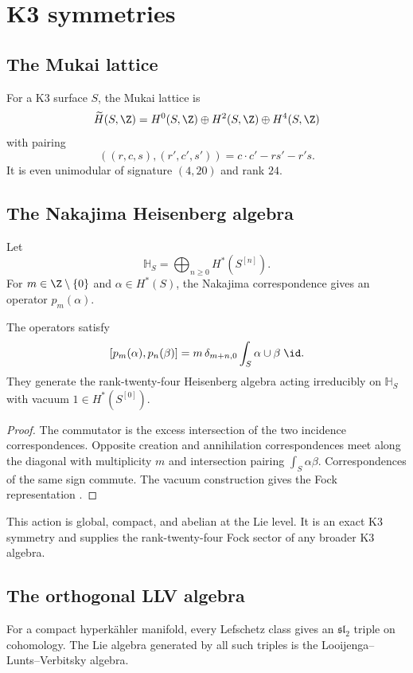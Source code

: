 \part{K3 symmetries}

\chapter{The Mukai lattice}
For a K3 surface $S$, the Mukai lattice is
\[
 \Mukai(S,\Z)=H^0(S,\Z)\oplus H^2(S,\Z)\oplus H^4(S,\Z)
\]
with pairing
\[
 ((r,c,s),(r',c',s'))=c\cdot c'-rs'-r's.
\]
It is even unimodular of signature $(4,20)$ and rank $24$.

\chapter{The Nakajima Heisenberg algebra}
Let
\[
 \mathbb H_S=\bigoplus_{n\ge0}H^*(S^{[n]}).
\]
For $m\in\Z\setminus\{0\}$ and $\alpha\in H^*(S)$, the Nakajima correspondence gives an operator $p_m(\alpha)$.

\begin{theorem}
The operators satisfy
\[
 [p_m(\alpha),p_n(\beta)]
 =m\,\delta_{m+n,0}\int_S\alpha\cup\beta\;\id.
\]
They generate the rank-twenty-four Heisenberg algebra acting irreducibly on $\mathbb H_S$ with vacuum $1\in H^*(S^{[0]})$.
\end{theorem}
\begin{proof}
The commutator is the excess intersection of the two incidence correspondences. Opposite creation and annihilation correspondences meet along the diagonal with multiplicity $m$ and intersection pairing $\int_S\alpha\beta$. Correspondences of the same sign commute. The vacuum construction gives the Fock representation \cite{Nakajima97}.
\end{proof}

This action is global, compact, and abelian at the Lie level. It is an exact K3 symmetry and supplies the rank-twenty-four Fock sector of any broader K3 algebra.

\chapter{The orthogonal LLV algebra}
For a compact hyperkähler manifold, every Lefschetz class gives an $\mathfrak{sl}_2$ triple on cohomology. The Lie algebra generated by all such triples is the Looijenga--Lunts--Verbitsky algebra.

